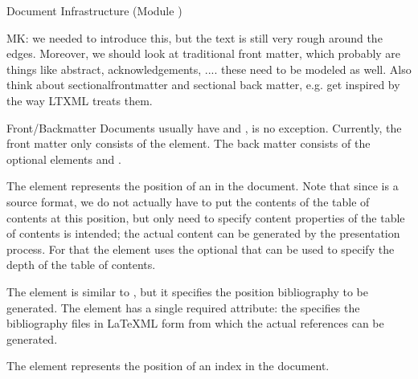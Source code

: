 \begin{tchapter}[id=omdoc-infrastructure,short=Document Infrastructure]{Document Infrastructure (Module )}
{\begin{newpart}{MK: we needed to introduce this, but the text is still very rough around
    the edges. Moreover, we should look at traditional front matter, which probably are
    things like abstract, acknowledgements, .... these need to be modeled as well. Also
    think about sectionalfrontmatter and sectional back matter, e.g. get inspired by the
    way LTXML treats them.}
\begin{tsection}[id=frontbackmatter]{Front/Backmatter}
  Documents usually have  and , \omdoc is no
  exception. Currently, the \omdoc front matter only consists of the
   element. The back matter consists of the
  optional elements  and . 

  The  element represents the position of an  in the document. Note that
  since \omdoc is a source format, we do not actually have to put the contents of the
  table of contents at this position, but only need to specify content properties of the
  table of contents is intended; the actual content can be generated by the presentation
  process. For that the  element uses the optional
   that can be used to specify the depth of the table
  of contents.

 The  element is similar to , but it specifies the
  position bibliography to be generated. The  element has a single
  required attribute: the  specifies the bibliography
  files in LaTeXML form
  from which the actual references can be generated.

  The  element represents the position of an index in the
  document.
\end{tsection}
\end{newpart}

}
\end{tchapter}
